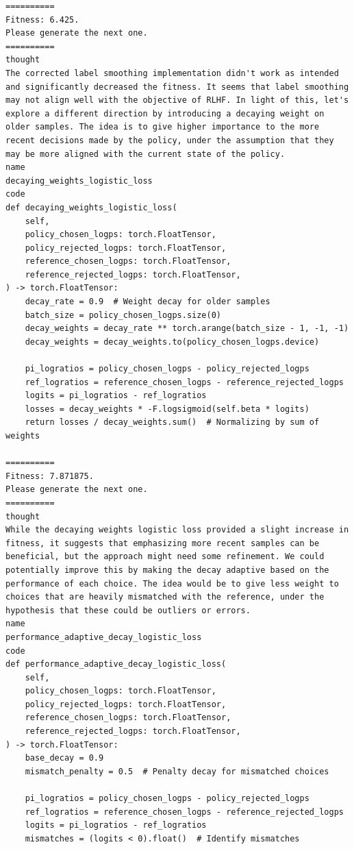 \documentclass{article}
\theoremstyle{plain}
\theoremstyle{definition}
\theoremstyle{remark}
\begin{document}
\begin{lstlisting}
==========
Fitness: 6.425.
Please generate the next one.
==========
thought
The corrected label smoothing implementation didn't work as intended and significantly decreased the fitness. It seems that label smoothing may not align well with the objective of RLHF. In light of this, let's explore a different direction by introducing a decaying weight on older samples. The idea is to give higher importance to the more recent decisions made by the policy, under the assumption that they may be more aligned with the current state of the policy.
name
decaying_weights_logistic_loss
code
def decaying_weights_logistic_loss(
    self,
    policy_chosen_logps: torch.FloatTensor,
    policy_rejected_logps: torch.FloatTensor,
    reference_chosen_logps: torch.FloatTensor,
    reference_rejected_logps: torch.FloatTensor,
) -> torch.FloatTensor:
    decay_rate = 0.9  # Weight decay for older samples
    batch_size = policy_chosen_logps.size(0)
    decay_weights = decay_rate ** torch.arange(batch_size - 1, -1, -1)
    decay_weights = decay_weights.to(policy_chosen_logps.device)

    pi_logratios = policy_chosen_logps - policy_rejected_logps
    ref_logratios = reference_chosen_logps - reference_rejected_logps
    logits = pi_logratios - ref_logratios
    losses = decay_weights * -F.logsigmoid(self.beta * logits)
    return losses / decay_weights.sum()  # Normalizing by sum of weights
    
==========
Fitness: 7.871875.
Please generate the next one.
==========
thought
While the decaying weights logistic loss provided a slight increase in fitness, it suggests that emphasizing more recent samples can be beneficial, but the approach might need some refinement. We could potentially improve this by making the decay adaptive based on the performance of each choice. The idea would be to give less weight to choices that are heavily mismatched with the reference, under the hypothesis that these could be outliers or errors.
name
performance_adaptive_decay_logistic_loss
code
def performance_adaptive_decay_logistic_loss(
    self,
    policy_chosen_logps: torch.FloatTensor,
    policy_rejected_logps: torch.FloatTensor,
    reference_chosen_logps: torch.FloatTensor,
    reference_rejected_logps: torch.FloatTensor,
) -> torch.FloatTensor:
    base_decay = 0.9
    mismatch_penalty = 0.5  # Penalty decay for mismatched choices

    pi_logratios = policy_chosen_logps - policy_rejected_logps
    ref_logratios = reference_chosen_logps - reference_rejected_logps
    logits = pi_logratios - ref_logratios
    mismatches = (logits < 0).float()  # Identify mismatches


\end{lstlisting}
\end{document}
